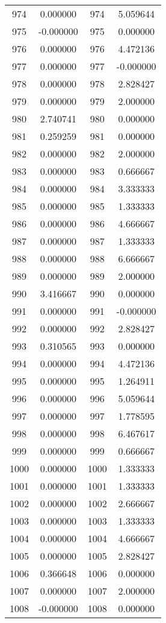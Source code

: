 \documentclass[12pt]{article}
\begin{document}
\begin{longtable}{@{}cccc@{}}
974 & 0.000000 & 974 & 5.059644 \\
975 & -0.000000 & 975 & 0.000000 \\
976 & 0.000000 & 976 & 4.472136 \\
977 & 0.000000 & 977 & -0.000000 \\
978 & 0.000000 & 978 & 2.828427 \\
979 & 0.000000 & 979 & 2.000000 \\
980 & 2.740741 & 980 & 0.000000 \\
981 & 0.259259 & 981 & 0.000000 \\
982 & 0.000000 & 982 & 2.000000 \\
983 & 0.000000 & 983 & 0.666667 \\
984 & 0.000000 & 984 & 3.333333 \\
985 & 0.000000 & 985 & 1.333333 \\
986 & 0.000000 & 986 & 4.666667 \\
987 & 0.000000 & 987 & 1.333333 \\
988 & 0.000000 & 988 & 6.666667 \\
989 & 0.000000 & 989 & 2.000000 \\
990 & 3.416667 & 990 & 0.000000 \\
991 & 0.000000 & 991 & -0.000000 \\
992 & 0.000000 & 992 & 2.828427 \\
993 & 0.310565 & 993 & 0.000000 \\
994 & 0.000000 & 994 & 4.472136 \\
995 & 0.000000 & 995 & 1.264911 \\
996 & 0.000000 & 996 & 5.059644 \\
997 & 0.000000 & 997 & 1.778595 \\
998 & 0.000000 & 998 & 6.467617 \\
999 & 0.000000 & 999 & 0.666667 \\
1000 & 0.000000 & 1000 & 1.333333 \\
1001 & 0.000000 & 1001 & 1.333333 \\
1002 & 0.000000 & 1002 & 2.666667 \\
1003 & 0.000000 & 1003 & 1.333333 \\
1004 & 0.000000 & 1004 & 4.666667 \\
1005 & 0.000000 & 1005 & 2.828427 \\
1006 & 0.366648 & 1006 & 0.000000 \\
1007 & 0.000000 & 1007 & 2.000000 \\
1008 & -0.000000 & 1008 & 0.000000 \\

\end{longtable}
\end{document}
